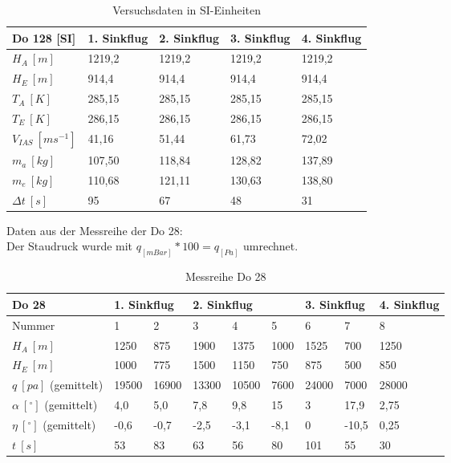 \begin{table}[h]
	\centering
	\begin{tabular}{| l | l | l | l | l | }
\hline
	Do 128 [SI] & 1. Sinkflug & 2. Sinkflug & 3. Sinkflug & 4. Sinkflug \\ \hline
	$H_A\ [m]$ & 1219,2 & 1219,2 & 1219,2 & 1219,2 \\ \hline
	$H_E\ [m]$  & 914,4 & 914,4 & 914,4 & 914,4 \\ \hline
	$T_A\ [K]$  & 285,15 & 285,15 & 285,15 & 285,15 \\ \hline
	$T_E\ [K]$  &  286,15 & 286,15 & 286,15 & 286,15 \\ \hline
	$V_{IAS}\ [ms^{-1}]$ & 41,16 & 51,44 & 61,73 & 72,02 \\ \hline
	$m_a\ [kg]$ & 107,50 & 118,84 & 128,82 & 137,89 \\ \hline
	$m_e\ [kg]$ & 110,68 & 121,11 & 130,63 & 138,80 \\ \hline
	$\Delta t\ [s]$ & 95 & 67 & 48 & 31 \\ \hline
\end{tabular}
	\caption{Versuchsdaten in SI-Einheiten}
	\label{tab:VersuchDaten3}
\end{table}

Daten aus der Messreihe der Do 28:\\
Der Staudruck wurde mit $q_{[mBar]}*100=q_{[Pa]}$ umrechnet.\\

\begin{table}[h]
\begin{tabular}{|l|l|l|l|l|l|l|l|l|}
\hline
Do 28                     & \multicolumn{2}{l|}{1. Sinkflug} & \multicolumn{3}{l|}{2. Sinkflug} & \multicolumn{2}{l|}{3. Sinkflug} & 4. Sinkflug \\ \hline
Nummer & 1               & 2              & 3         & 4         & 5        & 6               & 7              & 8           \\ \hline
$H_A\ [m]$              & 1250            & 875            & 1900      & 1375      & 1000     & 1525            & 700            & 1250        \\ \hline
$H_E\ [m]$              & 1000            & 775            & 1500      & 1150      & 750      & 875             & 500            & 850         \\ \hline
$q\ [pa]$ (gemittelt)    & 19500           & 16900          & 13300     & 10500     & 7600     & 24000           & 7000           & 28000       \\ \hline
$\alpha\ [^\circ]$  (gemittelt) & 4,0             & 5,0            & 7,8       & 9,8       & 15       & 3               & 17,9           & 2,75        \\ \hline
$\eta\ [^\circ]$ (gemittelt)   & -0,6            & -0,7           & -2,5      & -3,1      & -8,1     & 0               & -10,5         & 0,25        \\ \hline
$t\ [s]$                 & 53              & 83             & 63        & 56        & 80       & 101             & 55             & 30          \\ \hline
\end{tabular}
\caption{Messreihe Do 28}
	\label{tab:VersuchDaten4}
\end{table}
